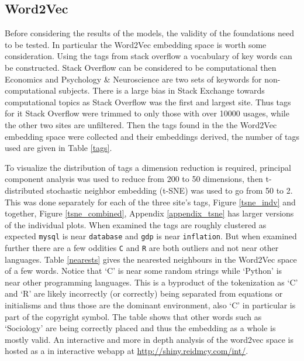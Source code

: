 \documentclass[12pt, a4paper]{article}
\begin{document}
\subsection{Word2Vec}

Before considering the results of the models, the validity of the foundations need to be tested. In particular the Word2Vec embedding space is worth some consideration. Using the tags from stack overflow a vocabulary of key words can be constructed. Stack Overflow can be considered to be computational then Economics and Psychology \& Neuroscience are two sets of keywords for non-computational subjects. There is a large bias in Stack Exchange towards computational topics as Stack Overflow was the first and largest site. Thus tags for it Stack Overflow were trimmed to only those with over \num{10000} usages, while the other two sites are unfiltered. Then the tags found in the the Word2Vec embedding space were collected and their embeddings derived, the number of tags used are given in Table \ref{tags}. 

To visualize the distribution of tags a dimension reduction is required, principal component analysis was used to reduce from 200 to 50 dimensions, then t-distributed stochastic neighbor embedding (t-SNE) \citep{maaten2008visualizing} was used to go from 50 to 2. This was done separately for each of the three site's tags, Figure \ref{tsne_indv} and together, Figure \ref{tsne_combined}, Appendix \ref{appendix_tsne} has larger versions of the individual plots. When examined the tags are roughly clustered as expected \texttt{mysql} is near \texttt{database} and \texttt{gdp} is near \texttt{inflation}. But when examined further there are a few oddities \texttt{C} and \texttt{R} are both outliers and not near other languages. Table \ref{nearests} gives the nearested neighbours in the Word2Vec space of a few words. Notice that `C' is near some random strings while `Python' is near other programming languages. This is a byproduct of the tokenization as `C' and `R' are likely incorrectly (or correctly) being separated from equations or initialisms and thus those are the dominant environment, also `C' in particular is part of the copyright symbol. The table shows that other words such as `Sociology' are being correctly placed and thus the embedding as a whole is mostly valid. An interactive and more in depth analysis of the word2vec space is hosted as a in interactive webapp at \href{http://shiny.reidmcy.com/int/}{http://shiny.reidmcy.com/int/}.
\end{document}
